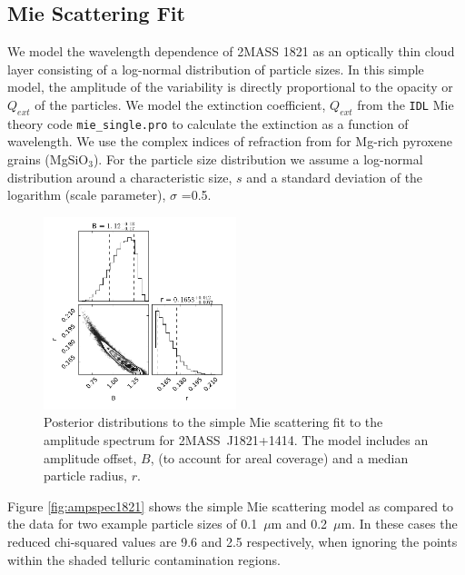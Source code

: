 \documentclass[twocolumn]{aastex6}
\newcommand{\shb}{2MASS~J1821+1414}
\begin{document}
\subsection{Mie Scattering Fit}

We model the wavelength dependence of 2MASS 1821 as an optically thin cloud layer consisting of a log-normal distribution of particle sizes.
In this simple model, the amplitude of the variability is directly proportional to the opacity or $Q_{ext}$ of the particles.
We model the extinction coefficient, $Q_{ext}$ from the \texttt{IDL} Mie theory code \texttt{mie\_single.pro} \citep{grainger04} to calculate the extinction as a function of wavelength.
We use the complex indices of refraction from \citet{dorschner95pyrox} for Mg-rich pyroxene grains (MgSiO$_3$).
For the particle size distribution we assume a log-normal distribution around a characteristic size, $s$ and a standard deviation of the logarithm (scale parameter), $\sigma$ =0.5.

\begin{figure}
\begin{centering}
\includegraphics[width=0.5\textwidth]{corner_j1821_mie_sc.pdf}
\caption{Posterior distributions to the simple Mie scattering fit to the amplitude spectrum for \shb.
The model includes an amplitude offset, $B$, (to account for areal coverage) and a median particle radius, $r$.}\label{fig:corner1821mie}
\end{centering}
\end{figure}

Figure \ref{fig:ampspec1821} shows the simple Mie scattering model as compared to the data for two example particle sizes of 0.1~$\mu$m and 0.2~$\mu$m.
In these cases the reduced chi-squared values are 9.6 and 2.5 respectively, when ignoring the points within the shaded telluric contamination regions.
\end{document}
